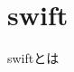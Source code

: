 \documentclass[../../../main]{subfiles}
\begin{document}
    \section{swift}\label{sec:phraseology-swift}

    swiftとは
\end{document}
